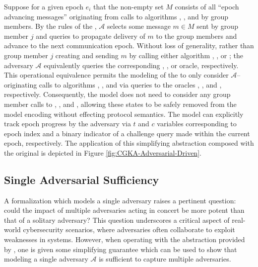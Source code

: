 \documentclass[authordraft,sigconf]{acmart}
\newcommand{\Adversary}{\ensuremath{\mathcal{A}}\xspace}
\begin{document}
Suppose for a given epoch $e_i$ that the non-empty set $M$ consists of all ``epoch advancing messages'' originating from calls to algorithms , , and  by group members.
By the rules of the \CGKAsec, \Adversary selects some message $m \in M$ sent by group member $j$ and queries  to propagate delivery of $m$ to the group members and advance to the next communication epoch.
Without loss of generality, rather than group member $j$ creating and sending $m$ by calling either algorithm , , or ; the adversary \Adversary equivalently queries the corresponding , , or  oracle, respectively.
This operational equivalence permits the modeling of the \CGKAsec to only consider \Adversary--originating calls to algorithms , , and  via queries to the oracles , , and , respectively.
Consequently, the model does not need to consider any group member calls to , , and , allowing these states to be safely removed from the model encoding without effecting protocol semantics.
The model can explicitly track epoch progress by the adversary via $t$ and $c$ variables corresponding to epoch index and a binary indicator of a challenge query made within the current epoch, respectively.
The application of this simplifying abstraction composed with the original \CGKAsec is depicted in Figure \ref{fig:CGKA-Adversarial-Driven}.

\subsection{Single Adversarial Sufficiency}
A formalization which models a single adversary raises a pertinent question: could the impact of multiple adversaries acting in concert be more potent than that of a solitary adversary?
This question underscores a critical aspect of real-world cybersecurity scenarios, where adversaries often collaborate to exploit weaknesses in systems.
However, when operating with the abstraction provided by \CGKAsec, one is given some simplifying guarantee which can be used to show that modeling a single adversary \Adversary is sufficient to capture multiple adversaries.
\end{document}
